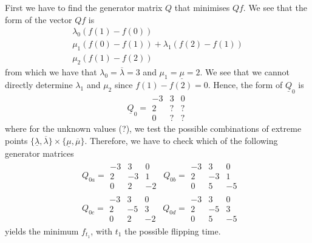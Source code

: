 \documentclass{article}
\begin{document}
First we have to find the generator matrix $Q$ that minimises $Qf$.
We see that the form of the vector $Qf$ is
\begin{equation*}  
 \begin{array}{|c|}
  \lambda_{0}(f(1)-f(0))\\
  \mu_{1}(f(0)-f(1))+\lambda_{1}(f(2)-f(1))\\
  \mu_{2}(f(1)-f(2))  
 \end{array}
 \end{equation*}
from which we have that $\lambda_{0}=\overline{\lambda}=3$ and $\mu_{1}=\underline{\mu}=2$.
We see that we cannot directly determine $\lambda_{1}$ and $\mu_{2}$ since $f(1)-f(2)=0$.
Hence, the form of $\underline{Q}_0$ is
\begin{equation*} 
 \underline{Q}_{0}= 
 \begin{array}{|rrr|}
  -3 & 3 & 0 \\
  2 & ? & ?  \\
  0 & ? & ?  
 \end{array}
 \end{equation*}
 where for the unknown values (?), we test the possible combinations of extreme points $\{\underline{\lambda},\overline{\lambda}\}\times\{\underline{\mu},\overline{\mu}\}$.
 Therefore, we have to check which of the following generator matrices
\begin{equation*}
\begin{split} 
 &Q_{0a}= 
 \begin{array}{|rrr|}
  -3 & 3 & 0 \\
  2 & -3 & 1 \\
  0 & 2 & -2  
 \end{array}\ \  
 Q_{0b}=
 \begin{array}{|rrr|}
  -3 & 3 & 0 \\
  2 & -3 & 1 \\
  0 & 5 & -5  
 \end{array}\\
 &Q_{0c}=
 \begin{array}{|rrr|}
  -3 & 3 & 0 \\
  2 & -5 & 3 \\
  0 & 2 & -2  
 \end{array}\ \ 
 Q_{0d}=
 \begin{array}{|rrr|}
  -3 & 3 & 0 \\
  2 & -5 & 3 \\
  0 & 5 & -5  
 \end{array}
 \end{split}
 \end{equation*}
 yields the minimum $f_{t_{1}}$, with $t_1$ the possible flipping time.\\\\
\end{document}
